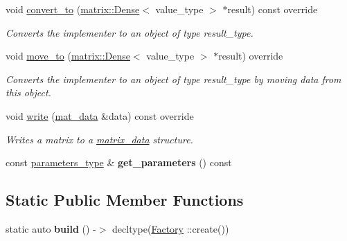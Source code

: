 \begin{DoxyCompactItemize}
void \hyperlink{classgko_1_1preconditioner_1_1Jacobi_a54ce952ac4a12c3f4686442375cd4dc8}{convert\+\_\+to} (\hyperlink{classgko_1_1matrix_1_1Dense}{matrix\+::\+Dense}$<$ value\+\_\+type $>$ $\ast$result) const override
\begin{DoxyCompactList}\small\item\em Converts the implementer to an object of type result\+\_\+type. \end{DoxyCompactList}\item 
void \hyperlink{classgko_1_1preconditioner_1_1Jacobi_a6d5e28b3033772bfc6c96fbe3caca003}{move\+\_\+to} (\hyperlink{classgko_1_1matrix_1_1Dense}{matrix\+::\+Dense}$<$ value\+\_\+type $>$ $\ast$result) override
\begin{DoxyCompactList}\small\item\em Converts the implementer to an object of type result\+\_\+type by moving data from this object. \end{DoxyCompactList}\item 
void \hyperlink{classgko_1_1preconditioner_1_1Jacobi_ac52bb1c70d4882876da1ee21c3b124ee}{write} (\hyperlink{structgko_1_1matrix__data}{mat\+\_\+data} \&data) const override
\begin{DoxyCompactList}\small\item\em Writes a matrix to a \hyperlink{structgko_1_1matrix__data}{matrix\+\_\+data} structure. \end{DoxyCompactList}\item 
\mbox{\label{classgko_1_1preconditioner_1_1Jacobi_a7410d911899907737de500aa4a70e06a}} 
const \hyperlink{structgko_1_1preconditioner_1_1Jacobi_1_1parameters__type}{parameters\+\_\+type} \& {\bfseries get\+\_\+parameters} () const
\end{DoxyCompactItemize}
\subsection*{Static Public Member Functions}
\begin{DoxyCompactItemize}
\item 
\mbox{\label{classgko_1_1preconditioner_1_1Jacobi_ae32cf3b8bc67b22dc20ee34f31e4e6c9}} 
static auto {\bfseries build} () -\/$>$ decltype(\hyperlink{classgko_1_1preconditioner_1_1Jacobi_1_1Factory}{Factory} \+::create())
\end{DoxyCompactItemize}
